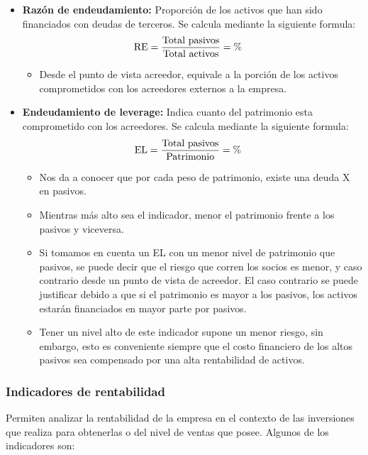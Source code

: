 \documentclass{templateNote}
\begin{document}
\begin{itemize}
    \item \textbf{Razón de endeudamiento:} Proporción de los activos que han sido financiados con deudas de terceros. Se calcula mediante la siguiente formula:
    \begin{align*}
        \textnormal{RE} &= \frac{\textnormal{Total pasivos}}{\textnormal{Total activos}} = \%
    \end{align*}
    \begin{itemize}
        \item Desde el punto de vista acreedor, equivale a la porción de los activos comprometidos con los acreedores externos a la empresa.
    \end{itemize}
    \item \textbf{Endeudamiento de leverage:} Indica cuanto del patrimonio esta comprometido con los acreedores. Se calcula mediante la siguiente formula: 
    \begin{align*}
        \textnormal{EL} &= \frac{\textnormal{Total pasivos}}{\textnormal{Patrimonio}} = \%
    \end{align*}
    \begin{itemize}
        \item Nos da a conocer que por cada peso de patrimonio, existe una deuda X en pasivos.
        \item Mientras más alto sea el indicador, menor el patrimonio frente a los pasivos y viceversa.
        \item Si tomamos en cuenta un EL con un menor nivel de patrimonio que pasivos, se puede decir que el riesgo que corren los socios es menor, y caso contrario desde un punto de vista de acreedor. El caso contrario se puede justificar debido a que si el patrimonio es mayor a los pasivos, los activos estarán financiados en mayor parte por pasivos.
        \item Tener un nivel alto de este indicador supone un menor riesgo, sin embargo, esto es conveniente siempre que el costo financiero de los altos pasivos sea compensado por una alta rentabilidad de activos.
    \end{itemize}
\end{itemize}

\subsubsection{Indicadores de rentabilidad}
\noindent Permiten analizar la rentabilidad de la empresa en el contexto de las inversiones que realiza para obtenerlas o del nivel de ventas que posee. Algunos de los indicadores son:
\end{document}
